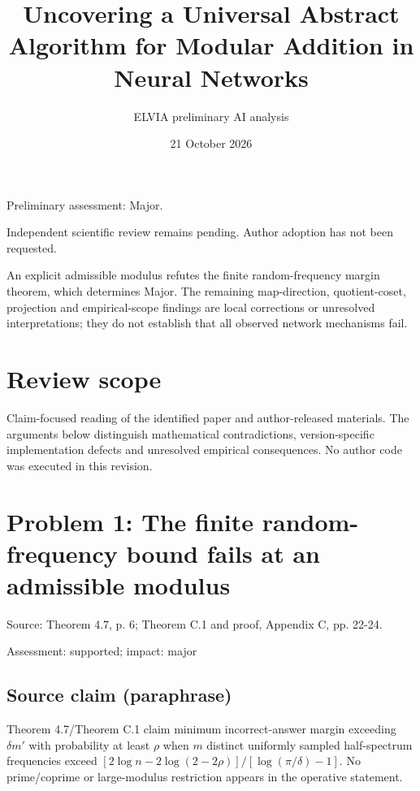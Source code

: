 \documentclass[11pt]{article}
\begin{document}
\title{Uncovering a Universal Abstract Algorithm for Modular Addition in Neural Networks}

\author{ELVIA preliminary AI analysis}\date{21 October 2026}\maketitle

Preliminary assessment: Major.\par

Independent scientific review remains pending. Author adoption has not been requested.

An explicit admissible modulus refutes the finite random-frequency margin theorem, which determines Major. The remaining map-direction, quotient-coset, projection and empirical-scope findings are local corrections or unresolved interpretations; they do not establish that all observed network mechanisms fail.

\section*{Review scope}

Claim-focused reading of the identified paper and author-released materials. The arguments below distinguish mathematical contradictions, version-specific implementation defects and unresolved empirical consequences. No author code was executed in this revision.

\section*{Problem 1: The finite random-frequency bound fails at an admissible modulus}

Source: Theorem 4.7, p. 6; Theorem C.1 and proof, Appendix C, pp. 22-24.

Assessment: supported; impact: major

\subsection*{Source claim (paraphrase)}

Theorem 4.7/Theorem C.1 claim minimum incorrect-answer margin exceeding \(\delta m'\) with probability at least \(\rho\) when \(m\) distinct uniformly sampled half-spectrum frequencies exceed \([2\log n-2\log(2-2\rho)]/[\log(\pi/\delta)-1]\). No prime/coprime or large-modulus restriction appears in the operative statement.
\end{document}
